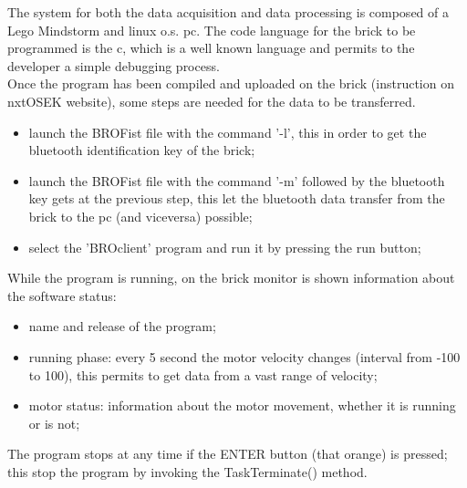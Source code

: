 The system for both the data acquisition and data processing is composed of a Lego Mindstorm and linux o.s. pc. The code language for the brick to be programmed is the c, which is a well known language and permits to the developer a simple debugging process. \\ Once the program has been compiled and uploaded on the brick (instruction on nxtOSEK website), some steps are needed for the data to be transferred. \\
\begin{itemize}
\item launch the BROFist file with the command '-l', this in order to get the bluetooth identification key of the brick;
\item launch the BROFist file with the command '-m' followed by the bluetooth key gets at the previous step, this let the bluetooth data transfer from the brick to the pc (and viceversa) possible;   
\item select the 'BROclient' program and run it by pressing the run button;
\end{itemize}

While the program is running, on the brick monitor is shown information about the software status:
\begin{itemize}
\item name and release of the program; 
\item running phase: every 5 second the motor velocity changes (interval from -100 to 100), this permits to get data from a vast range of velocity;  
\item motor status: information about the motor movement, whether it is running or is not; 
\end{itemize}
The program stops at any time if the ENTER button (that orange) is pressed; this stop the program by invoking the TaskTerminate() method. 
